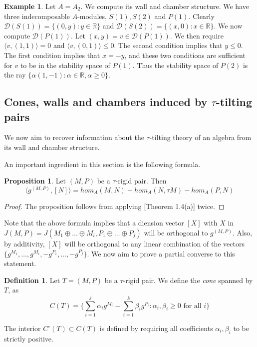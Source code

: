 \documentclass[]{article}
\theoremstyle{definition}
\newtheorem{definition}{Definition}[section]
\newtheorem{proposition}{Proposition}[section]
\newtheorem{example}{Example}[section]
\newcommand{\tu}{\ensuremath{\tau}}
\begin{document}
\begin{example}
	Let $A = A_2$. We compute its wall and chamber structure. We have three indecomposable $A$-modules, $S(1),S(2)$ and $P(1)$. Clearly $\mathcal{D}(S(1)) = \{(0,y): y \in \mathbb{R}\}$ and $\mathcal{D}(S(2)) = \{(x,0): x \in \mathbb{R}\}$. We now compute $\mathcal{D}(P(1))$. Let $(x,y) = v \in \mathcal{D}(P(1))$. We then require $\langle v,(1,1)\rangle = 0$ and $\langle v,(0,1)\rangle \leq 0$. The second condition implies that $y \leq 0$. The first condition implies that $x = -y$, and these two conditions are sufficient for $v$ to be in the stability space of $P(1)$. Thus the stability space of $P(2)$ is the ray $\{\alpha(1,-1) :  \alpha \in \mathbb{R}, \alpha \geq 0\}$. 
\end{example}


\subsection{Cones, walls and chambers induced by \tu-tilting pairs}
We now aim to recover information about the \tu-tilting theory of an algebra from its wall and chamber structure.

An important ingredient in this section is the following formula.
\begin{proposition}
	Let $(M,P)$ be a \tu-rigid pair. Then
 \[\langle g^{(M,P)},[N]\rangle = hom_A(M,N) - hom_A(N,\tau M) - hom_A(P,N)\]
\end{proposition}

\begin{proof}
	The proposition follows from applying \cite{auslander1985modules}[Theorem 1.4(a)] twice.
\end{proof}

Note that the above formula implies that a diension vector $[X]$ with $X$ in $J(M,P) = J(M_1\oplus\dots\oplus M_i,P_1\oplus\dots\oplus P_j)$ will be orthogonal to $g^{(M,P)}$. Also, by additivity, $[X]$ will be orthogonal to any linear combination of the vectors $\{g^{M_1},\dots,g^{M_i},-g^{P_1},\dots,-g^{P_j}\}$. We now aim to prove a partial converse to this statement.
\begin{definition}
	Let $T = (M,P)$ be a \tu-rigid pair. We define the \textit{cone} spanned by $T$, as \[C(T) = \{\sum_{i = 1}^{j} \alpha_ig^{M_i} - \sum_{i = 1}^{k}\beta_ig^{P_i} : \alpha_i,\beta_i \geq 0 \text{ for all } i\}\]
	
	The interior $C^\circ(T) \subset C(T)$ is defined by requiring all coefficients $\alpha_i,\beta_i$ to be strictly positive.
\end{definition} 
\end{document}
